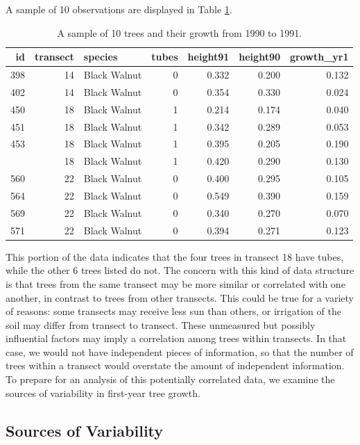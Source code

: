\documentclass[
]{krantz}
\begin{document}
A sample of 10 observations are displayed in Table \ref{tab:treeTubeTab}.

\begin{table}

\caption{\label{tab:treeTubeTab}A sample of 10 trees and their growth from 1990 to 1991.}
\centering
\begin{tabular}[t]{rrlrrrr}
\toprule
id & transect & species & tubes & height91 & height90 & growth\_yr1\\
\midrule
398 & 14 & Black Walnut & 0 & 0.332 & 0.200 & 0.132\\
402 & 14 & Black Walnut & 0 & 0.354 & 0.330 & 0.024\\
450 & 18 & Black Walnut & 1 & 0.214 & 0.174 & 0.040\\
451 & 18 & Black Walnut & 1 & 0.342 & 0.289 & 0.053\\
453 & 18 & Black Walnut & 1 & 0.395 & 0.205 & 0.190\\
\addlinespace
458 & 18 & Black Walnut & 1 & 0.420 & 0.290 & 0.130\\
560 & 22 & Black Walnut & 0 & 0.400 & 0.295 & 0.105\\
564 & 22 & Black Walnut & 0 & 0.549 & 0.390 & 0.159\\
569 & 22 & Black Walnut & 0 & 0.340 & 0.270 & 0.070\\
571 & 22 & Black Walnut & 0 & 0.394 & 0.271 & 0.123\\
\bottomrule
\end{tabular}
\end{table}

This portion of the data indicates that the four trees in transect 18 have tubes, while the other 6 trees listed do not. The concern with this kind of data structure is that trees from the same transect may be more similar or correlated with one another, in contrast to trees from other transects. This could be true for a variety of reasons: some transects may receive less sun than others, or irrigation of the soil may differ from transect to transect. These unmeasured but possibly influential factors may imply a correlation among trees within transects. In that case, we would not have independent pieces of information, so that the number of trees within a transect would overstate the amount of independent information. To prepare for an analysis of this potentially correlated data, we examine the sources of variability in first-year tree growth.

\subsection{Sources of Variability}\label{sources-of-variability-1}
\end{document}
